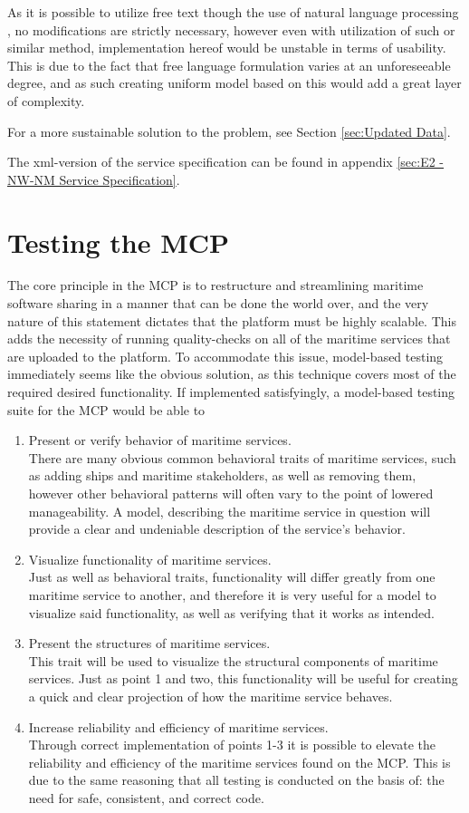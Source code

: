 As it is possible to utilize free text though the use of natural language processing \cite{nlp}, no modifications are strictly necessary, however even with utilization of such or similar method, implementation hereof would be unstable in terms of usability. This is due to the fact that free language formulation varies at an unforeseeable degree, and as such creating uniform model based on this would add a great layer of complexity.

For a more sustainable solution to the problem, see Section \ref{sec:Updated Data}.

The xml-version of the service specification can be found in appendix \ref{sec:E2 - NW-NM Service Specification}.

\section{Testing the MCP}

The core principle in the MCP is to restructure and streamlining maritime software sharing in a manner that can be done the world over, and the very nature of this statement dictates that the platform must be highly scalable. This adds the necessity of running quality-checks on all of the maritime services that are uploaded to the platform. To accommodate this issue, model-based testing immediately seems like the obvious solution, as this technique covers most of the required desired functionality. If implemented satisfyingly, a model-based testing suite for the MCP would be able to
\begin{enumerate}
	\item Present or verify behavior of maritime services.\\
		There are many obvious common behavioral traits of maritime services, such as adding ships and maritime stakeholders, as well as removing them, however other behavioral patterns will often vary to the point of lowered manageability. A model, describing the maritime service in question will provide a clear and undeniable description of the service's behavior.
	\item Visualize functionality of maritime services.\\
		Just as well as behavioral traits, functionality will differ greatly from one maritime service to another, and therefore it is very useful for a model to visualize said functionality, as well as verifying that it works as intended.
	\item Present the structures of maritime services.\\
		This trait will be used to visualize the structural components of maritime services. Just as point 1 and two, this functionality will be useful for creating a quick and clear projection of how the maritime service behaves.
	\item Increase reliability and efficiency of maritime services.\\
		Through correct implementation of points 1-3 it is possible to elevate the reliability and efficiency of the maritime services found on the MCP. This is due to the same reasoning that all testing is conducted on the basis of: the need for safe, consistent, and correct code.
\end{enumerate}

